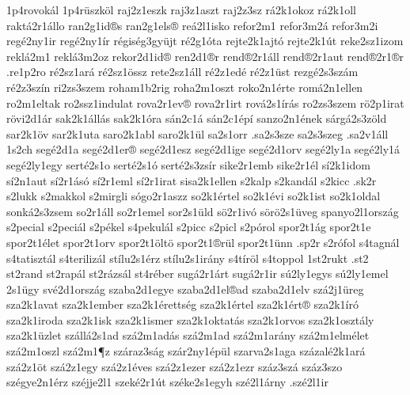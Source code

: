{1p4rovok^^e1l
1p4r^^fcszk^^f6l
raj2z1eszk
raj3z1aszt
raj2z3sz
r^^e12k1okoz
r^^e12k1oll
rakt^^e12r1^^e1llo
ran2g1id^^aes
ran2g1els^^ae
re^^e12l1isko
refor2m1 %
refor3m2^^e1 %
refor3m2i %
reg^^e92ny1ir
reg^^e92ny1^^edr
r^^e9gis^^e9g3gy^^fcjt
r^^e92g1^^f3ta
rejte2k1ajt^^f3
rejte2k1^^fat
reke2sz1izom
rekl^^e12m1
rekl^^e13m2oz
rekor2d1id^^ae
ren2d1^^aer
rend^^ae2r1^^e1ll
rend^^ae2r1aut
rend^^ae2r1^^aer
.re1p2ro
r^^e92sz1ar^^e1
r^^e92sz1^^f6ssz
rete2sz1^^e1ll
r^^e92z1ed^^e9
r^^e92z1^^fcst
rezg^^e92s3sz^^e1m
r^^e92z3sz^^edn
ri2zs3szem
roham1b2rig
roha2m1oszt
roko2n1^^e9rte
rom^^e12n1ellen
ro2m1eltak
ro2ssz1indulat
rova2r1ev^^ae
rova2r1irt
rov^^e12s1^^edr^^e1s
ro2zs3szem
r^^f62p1irat
r^^f6vi2d1^^e1r
sak2k1^^e1ll^^e1s
sak2k1^^f3ra
s^^e1n2c1^^e1
s^^e1n2c1^^e9p^^ed
sanzo2n1^^e9nek
s^^e1rg^^e12s3z^^f6ld
sar2k1^^f6v
sar2k1uta
saro2k1abl
saro2k1^^fcl
sa2s1orr
.sa2s3sze
sa2s3szeg
.sa2v1^^e1ll
1s2ch		%
seg^^e92d1a
seg^^e92d1er^^ae
seg^^e92d1esz
seg^^e92d1ige
seg^^e92d1orv
seg^^e92ly1a
seg^^e92ly1^^e1
seg^^e92ly1egy
sert^^e92s1o
sert^^e92s1^^f3
sert^^e92s3zs^^edr
sike2r1emb
sike2r1^^e9l
s^^ed2k1idom
s^^ed2n1aut
s^^ed2r1^^e1s^^f3
s^^ed2r1eml
s^^ed2r1irat
sisa2k1ellen
s2kalp
s2kand^^e1l
s2kicc
.sk2r
s2lukk
s2makkol
s2mirgli
s^^f3go2r1aszz
so2k1^^e9rtel
so2k1^^e9vi
so2k1ist
so2k1oldal
sonk^^e12s3zsem
so2r1^^e1ll
so2r1emel
sor2s1^^fcld
s^^f62r1iv^^f3
s^^f6r^^f62s1^^fcveg
spanyo2l1orsz^^e1g
s2pecial
s2peci^^e1l
s2p^^e9kel
s4pekul^^e1l
s2picc
s2picl
s2p^^f3rol
spor2t1^^e1g
spor2t1e
spor2t1^^e9let
spor2t1orv
spor2t1^^f6lt^^f6
spor2t1^^aer^^fcl
spor2t1^^fcnn
.sp2r
s2r^^f3fol
s4tagn^^e1l
s4tatiszt^^e1l
s4teriliz^^e1l
st^^edlu2s1^^e9rz
st^^edlu2s1ir^^e1ny
s4t^^edr^^f6l
s4toppol
1st2rukt %
.st2 %
st2rand
st2rap^^e1l
st2r^^e1zs^^e1l
st4r^^e9ber
sug^^e12r1^^e1rt
sug^^e12r1ir
s^^fa2ly1egys
s^^fa2ly1emel
2s1^^fcgy
sv^^e92d1orsz^^e1g
szaba2d1egye
szaba2d1el^^aead
szaba2d1elv
sz^^e12j1^^fcreg
sza2k1avat
sza2k1ember
sza2k1^^e9retts^^e9g
sza2k1^^e9rtel
sza2k1^^e9rt^^ae
sza2k1^^edr^^f3
sza2k1iroda
sza2k1isk
sza2k1ismer
sza2k1oktat^^e1s
sza2k1orvos
sza2k1oszt^^e1ly
sza2k1^^fczlet
sz^^e1ll^^e12s1ad
sz^^e12m1ad^^e1s
sz^^e12m1ad
sz^^e12m1ar^^e1ny
sz^^e12m1elm^^e9let
sz^^e12m1oszl
sz^^e12m1^^b6z
sz^^e1raz3s^^e1g
sz^^e1r2ny1^^e9p^^fcl
szarva2s1aga
sz^^e1zal^^e92k1ar^^e1
sz^^e12z1^^f6t
sz^^e12z1egy
sz^^e12z1^^e9ves
sz^^e12z1ezer
sz^^e12z1ezr
sz^^e1z3sz^^e1
sz^^e1z3szo
sz^^e9gye2n1^^e9rz
sz^^e9jje2l1
szek^^e92r1^^fat
sz^^e9ke2s1egyh
sz^^e92l1^^e1rny
.sz^^e92l1ir
}
